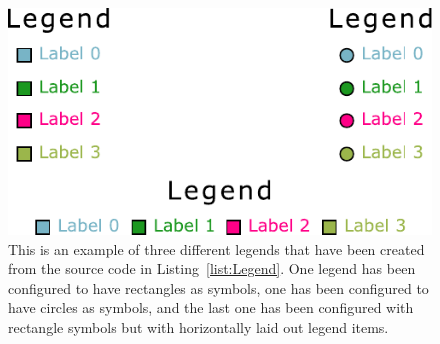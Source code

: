 \begin{figure}[tp]
\centering
\includegraphics[keepaspectratio,width=\linewidth / 2,height=\fullh]{diagrams/legend.pdf}
\caption[Legend Example]{
  This is an example of three different legends that have been created from the source code in Listing~\ref{list:Legend}.
  One legend has been configured to have rectangles as symbols, one has been configured to have circles as symbols, and the last one has been configured with rectangle symbols but with horizontally laid out legend items.
}
\label{fig:Legend}
\end{figure}

